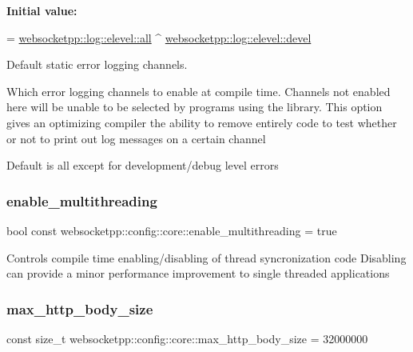 {\bfseries Initial value\+:}
\begin{DoxyCode}
=
        \mbox{\hyperlink{structwebsocketpp_1_1log_1_1elevel_a9b31ff708c221d314f9f4eb3ff2b1ad7}{websocketpp::log::elevel::all}} ^ 
      \mbox{\hyperlink{structwebsocketpp_1_1log_1_1elevel_a0b1dbc650c6f2711522c096496423726}{websocketpp::log::elevel::devel}}
\end{DoxyCode}


Default static error logging channels. 

Which error logging channels to enable at compile time. Channels not enabled here will be unable to be selected by programs using the library. This option gives an optimizing compiler the ability to remove entirely code to test whether or not to print out log messages on a certain channel

Default is all except for development/debug level errors \mbox{\label{structwebsocketpp_1_1config_1_1core_ad3ed5fc89c7a79e7c2c5193f640d87ba}} 
\subsubsection{\texorpdfstring{enable\+\_\+multithreading}{enable\_multithreading}}
{\footnotesize\ttfamily bool const websocketpp\+::config\+::core\+::enable\+\_\+multithreading = true\hspace{0.3cm}{\ttfamily [static]}}

Controls compile time enabling/disabling of thread syncronization code Disabling can provide a minor performance improvement to single threaded applications \mbox{\label{structwebsocketpp_1_1config_1_1core_a4836b30dbc83db465f44aabae4e8ef55}} 
\subsubsection{\texorpdfstring{max\+\_\+http\+\_\+body\+\_\+size}{max\_http\_body\_size}}
{\footnotesize\ttfamily const size\+\_\+t websocketpp\+::config\+::core\+::max\+\_\+http\+\_\+body\+\_\+size = 32000000\hspace{0.3cm}{\ttfamily [static]}}



